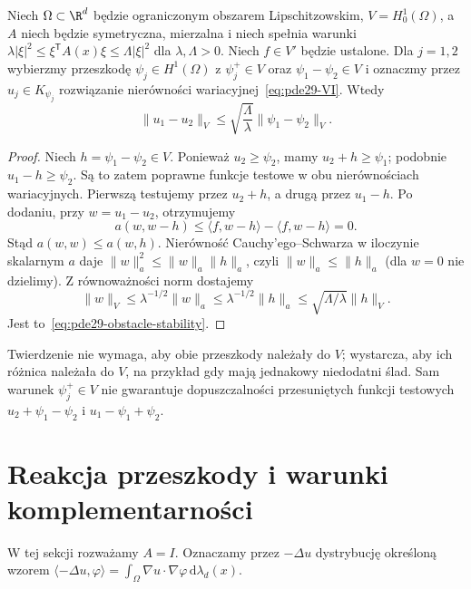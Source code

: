 \begin{twierdzenie}
\label{thm:pde29-obstacle-stability}
Niech $\Omega\subset\R^d$ będzie ograniczonym obszarem
Lipschitzowskim, $V=H_0^1(\Omega)$, a $A$ niech będzie
symetryczna, mierzalna i niech spełnia warunki
$\lambda|\xi|^2\le\xi^{\mathsf T}A(x)\xi\le\Lambda|\xi|^2$
dla $\lambda,\Lambda>0$. Niech $f\in V'$ będzie ustalone.
Dla $j=1,2$ wybierzmy przeszkodę $\psi_j\in H^1(\Omega)$
z $\psi_j^+\in V$ oraz $\psi_1-\psi_2\in V$
i oznaczmy przez $u_j\in K_{\psi_j}$ rozwiązanie
nierówności wariacyjnej~\eqref{eq:pde29-VI}.
Wtedy
\begin{equation}\label{eq:pde29-obstacle-stability}
 \|u_1-u_2\|_V\le\sqrt{\frac{\Lambda}{\lambda}}
 \|\psi_1-\psi_2\|_V.
\end{equation}
\end{twierdzenie}
\begin{proof}
Niech $h=\psi_1-\psi_2\in V$.
Ponieważ $u_2\ge\psi_2$, mamy $u_2+h\ge\psi_1$;
podobnie $u_1-h\ge\psi_2$. Są to zatem poprawne
funkcje testowe w obu nierównościach wariacyjnych.
Pierwszą testujemy przez $u_2+h$, a drugą przez $u_1-h$.
Po dodaniu, przy $w=u_1-u_2$, otrzymujemy
\[
 a(w,w-h)\le\langle f,w-h\rangle
                 -\langle f,w-h\rangle=0.
\]
Stąd $a(w,w)\le a(w,h)$.
Nierówność Cauchy'ego--Schwarza w iloczynie
skalarnym $a$ daje $\|w\|_a^2\le\|w\|_a\|h\|_a$,
czyli $\|w\|_a\le\|h\|_a$ (dla $w=0$ nie dzielimy).
Z równoważności norm dostajemy
\[
 \|w\|_V\le\lambda^{-1/2}\|w\|_a
 \le\lambda^{-1/2}\|h\|_a
 \le\sqrt{\Lambda/\lambda}\|h\|_V.
\]
Jest to~\eqref{eq:pde29-obstacle-stability}.
\end{proof}

\begin{uwaga}
Twierdzenie nie wymaga, aby obie przeszkody należały
do $V$; wystarcza, aby ich różnica należała do $V$,
na przykład gdy mają jednakowy niedodatni ślad.
Sam warunek $\psi_j^+\in V$ nie gwarantuje
dopuszczalności przesuniętych funkcji testowych
$u_2+\psi_1-\psi_2$ i $u_1-\psi_1+\psi_2$.
\end{uwaga}

\section{Reakcja przeszkody i warunki komplementarności}
W tej sekcji rozważamy $A=I$. Oznaczamy przez $-\Delta u$
dystrybucję określoną wzorem
$\langle-\Delta u,\varphi\rangle
=\int_\Omega\nabla u\cdot\nabla\varphi\,\mathrm d\lambda_d(x)$.

